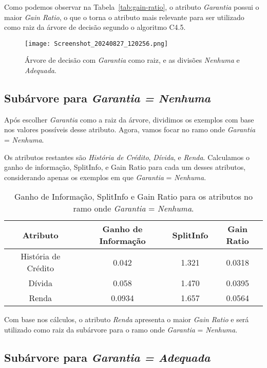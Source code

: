 \documentclass[a4paper,12pt]{article}
\begin{document}
Como podemos observar na Tabela~\ref{tab:gain-ratio}, o atributo \textit{Garantia} possui o maior \textit{Gain Ratio}, o que o torna o atributo mais relevante para ser utilizado como raiz da árvore de decisão segundo o algoritmo C4.5.


\begin{figure}[H]
\centering
\texttt{[image: Screenshot\_20240827\_120256.png]} %
\caption{Árvore de decisão com \textit{Garantia} como raiz, e as divisões \textit{Nenhuma} e \textit{Adequada}.}
\label{fig:arvore-decisao}
\end{figure}


\subsection{Subárvore para \textit{Garantia = Nenhuma}}

Após escolher \textit{Garantia} como a raiz da árvore, dividimos os exemplos com base nos valores possíveis desse atributo. Agora, vamos focar no ramo onde \textit{Garantia} = \textit{Nenhuma}.

Os atributos restantes são \textit{História de Crédito}, \textit{Dívida}, e \textit{Renda}. Calculamos o ganho de informação, SplitInfo, e Gain Ratio para cada um desses atributos, considerando apenas os exemplos em que \textit{Garantia} = \textit{Nenhuma}.

\begin{table}[H]
\centering
\begin{tabular}{|c|c|c|c|}
\hline
\textbf{Atributo} & \textbf{Ganho de Informação} & \textbf{SplitInfo} & \textbf{Gain Ratio} \\
\hline
História de Crédito & 0.042 & 1.321 & 0.0318 \\
\hline
Dívida & 0.058 & 1.470 & 0.0395 \\
\hline
Renda & 0.0934 & 1.657 & 0.0564 \\
\hline
\end{tabular}
\caption{Ganho de Informação, SplitInfo e Gain Ratio para os atributos no ramo onde \textit{Garantia} = \textit{Nenhuma}.}
\label{tab:gain-ratio-nenhuma}
\end{table}

Com base nos cálculos, o atributo \textit{Renda} apresenta o maior \textit{Gain Ratio} e será utilizado como raiz da subárvore para o ramo onde \textit{Garantia} = \textit{Nenhuma}.

\subsection{Subárvore para \textit{Garantia = Adequada}}
\end{document}
